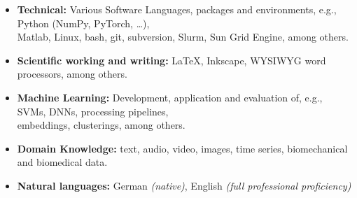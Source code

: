 
\begin{itemize}
    \item [] \textbf{Technical:}
    Various Software Languages, packages and environments, e.g.,
    Python (NumPy, PyTorch, \dots),\\
    \vphantom{}\qquad Matlab, Linux, bash, git, subversion, Slurm, Sun Grid Engine, among others.

    \item[] \textbf{Scientific working and writing:}
    LaTeX, Inkscape, WYSIWYG word processors, among others.

    \item[] \textbf{Machine Learning:} Development, application and evaluation of, e.g., 
    SVMs, DNNs, processing pipelines,\\
    \vphantom{}\qquad embeddings, clusterings, among others.

    \item[] \textbf{Domain Knowledge:}
    text, audio, video, images, time series, biomechanical and biomedical data.

    \item[] \textbf{Natural languages:}
    German \textit{(native)}, English \textit{(full professional proficiency)}
\end{itemize}













